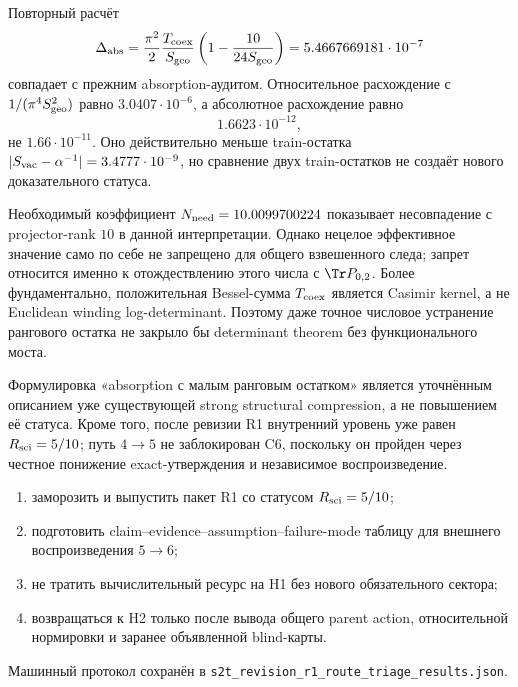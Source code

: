 Повторный расчёт
\begin{equation}
 \Delta_{\rm abs}
 =\frac{\pi^2}{2}\frac{T_{\rm coex}}{S_{\rm geo}}
  \left(1-\frac{10}{24S_{\rm geo}}\right)
 =5.4667669181\cdot10^{-7}
\end{equation}
совпадает с прежним absorption-аудитом. Относительное расхождение с
\(1/(\pi^4S_{\rm geo}^2)\) равно \(3.0407\cdot10^{-6}\), а абсолютное
расхождение равно
\begin{equation}
 1.6623\cdot10^{-12},
\end{equation}
не \(1.66\cdot10^{-11}\). Оно действительно меньше train-остатка
\(|S_{\rm vac}-\alpha^{-1}|=3.4777\cdot10^{-9}\), но сравнение двух
train-остатков не создаёт нового доказательного статуса.

Необходимый коэффициент \(N_{\rm need}=10.0099700224\) показывает
несовпадение с projector-rank \(10\) в данной интерпретации. Однако
нецелое эффективное значение само по себе не запрещено для общего
взвешенного следа; запрет относится именно к отождествлению этого числа с
\(\Tr P_{0,2}\). Более фундаментально, положительная Bessel-сумма
\(T_{\rm coex}\) является Casimir kernel, а не Euclidean winding
log-determinant. Поэтому даже точное числовое устранение рангового остатка
не закрыло бы determinant theorem без функционального моста.

\begin{remark}
Формулировка «absorption с малым ранговым остатком» является уточнённым
описанием уже существующей strong structural compression, а не повышением
её статуса. Кроме того, после ревизии R1 внутренний уровень уже равен
\(R_{\rm sci}=5/10\); путь \(4\to5\) не заблокирован C6, поскольку он пройден
через честное понижение exact-утверждения и независимое воспроизведение.
\end{remark}

\begin{protocol}
\begin{enumerate}
 \item заморозить и выпустить пакет R1 со статусом \(R_{\rm sci}=5/10\);
 \item подготовить claim--evidence--assumption--failure-mode таблицу для
 внешнего воспроизведения \(5\to6\);
 \item не тратить вычислительный ресурс на H1 без нового обязательного
 сектора;
 \item возвращаться к H2 только после вывода общего parent action,
 относительной нормировки и заранее объявленной blind-карты.
\end{enumerate}
\end{protocol}

Машинный протокол сохранён в
\texttt{s2t\_revision\_r1\_route\_triage\_results.json}.